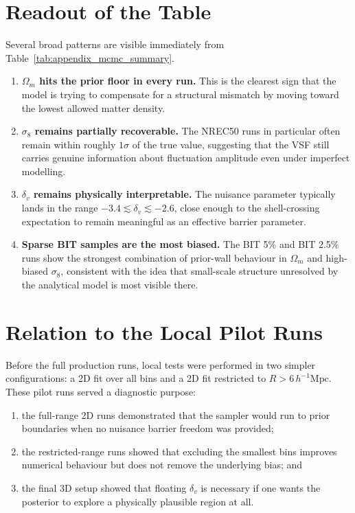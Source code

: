 \documentclass[12pt]{report}
\begin{document}
\section{Readout of the Table}

Several broad patterns are visible immediately from Table~\ref{tab:appendix_mcmc_summary}.

\begin{enumerate}
    \item \textbf{$\Omega_m$ hits the prior floor in every run.} This is the clearest sign that the model is trying to compensate for a structural mismatch by moving toward the lowest allowed matter density.
    \item \textbf{$\sigma_8$ remains partially recoverable.} The NREC50 runs in particular often remain within roughly $1\sigma$ of the true value, suggesting that the VSF still carries genuine information about fluctuation amplitude even under imperfect modelling.
    \item \textbf{$\delta_v$ remains physically interpretable.} The nuisance parameter typically lands in the range $-3.4 \lesssim \delta_v \lesssim -2.6$, close enough to the shell-crossing expectation to remain meaningful as an effective barrier parameter.
    \item \textbf{Sparse BIT samples are the most biased.} The BIT 5\% and BIT 2.5\% runs show the strongest combination of prior-wall behaviour in $\Omega_m$ and high-biased $\sigma_8$, consistent with the idea that small-scale structure unresolved by the analytical model is most visible there.
\end{enumerate}

\section{Relation to the Local Pilot Runs}

Before the full production runs, local tests were performed in two simpler configurations: a 2D fit over all bins and a 2D fit restricted to $R>6\,h^{-1}\mathrm{Mpc}$. These pilot runs served a diagnostic purpose:
\begin{enumerate}
    \item the full-range 2D runs demonstrated that the sampler would run to prior boundaries when no nuisance barrier freedom was provided;
    \item the restricted-range runs showed that excluding the smallest bins improves numerical behaviour but does not remove the underlying bias; and
    \item the final 3D setup showed that floating $\delta_v$ is necessary if one wants the posterior to explore a physically plausible region at all.
\end{enumerate}
\end{document}
